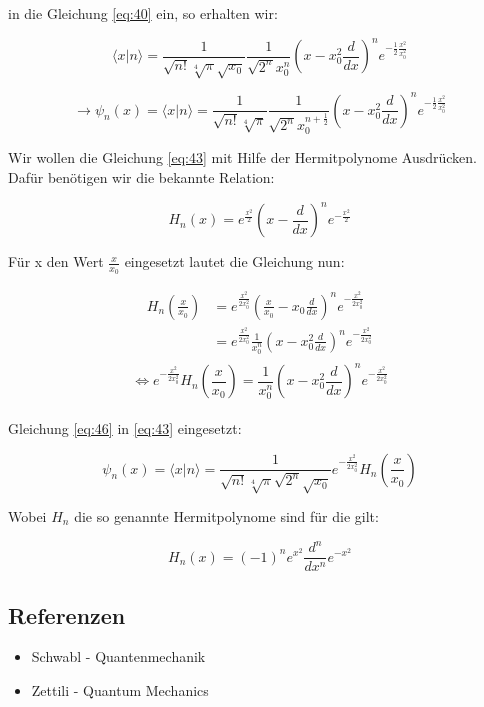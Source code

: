  in die Gleichung \eqref{eq:40} ein, so erhalten wir:

 \begin{equation}
   \label{eq:42}
    \langle x |n\rangle = \frac{1}{\sqrt{n!}\sqrt[4]{\pi}\sqrt{x_0}} \frac{1}{\sqrt{2^n}x_0^n}\left( x - x_0^2 \frac{d}{dx}\right)^n  e^{-\frac{1}{2}\frac{x^2}{x_0^2}}
 \end{equation}

 \begin{equation}
   \label{eq:43}
  \rightarrow  \boxed{\psi_n(x) =  \langle x |n\rangle = \frac{1}{\sqrt{n!}\sqrt[4]{\pi}} \frac{1}{\sqrt{2^n}x_0^{n+\frac{1}{2}}}\left( x - x_0^2 \frac{d}{dx}\right)^n  e^{-\frac{1}{2}\frac{x^2}{x_0^2}}   }
 \end{equation}



Wir wollen die Gleichung \eqref{eq:43} mit Hilfe der Hermitpolynome Ausdrücken. Dafür benötigen wir die bekannte Relation:

\begin{equation}
  \label{eq:44}
  H_n(x) = e^{\frac{x^2}{2}} \left( x-\frac{d}{dx}\right)^n e^{-\frac{x^2}{2}}
\end{equation}

Für x den Wert \(\frac{x}{x_0}\) eingesetzt lautet die Gleichung nun:

\begin{align}
  H_n\left(\frac{x}{x_0} \right) &= e^{\frac{x^2}{2x_0^2}} \left( \frac{x}{x_0}- x_0\frac{d}{dx}\right)^n e^{-\frac{x^2}{2x_0^2}} \\
 &= e^{\frac{x^2}{2x_0^2}} \frac{1}{x_0^n} \left( x - x_0^2\frac{d}{dx}\right)^n e^{-\frac{x^2}{2x_0^2}} \\ \label{eq:45}
\end{align}
\begin{equation}
  \label{eq:46}
  \Leftrightarrow e^{-\frac{x^2}{2x_0^2}}H_n\left(\frac{x}{x_0} \right) = \frac{1}{x_0^n} \left( x - x_0^2\frac{d}{dx}\right)^n e^{-\frac{x^2}{2x_0^2}} 
\end{equation}
\\
Gleichung \eqref{eq:46} in \eqref{eq:43} eingesetzt:

\begin{equation}
  \label{eq:47}
   \boxed{\psi_n(x) =  \langle x |n\rangle = \frac{1}{\sqrt{n!}\sqrt[4]{\pi}\sqrt{2^n}\sqrt{x_0}}  e^{-\frac{x^2}{2x_0^2}}H_n\left(\frac{x}{x_0} \right)   }
\end{equation}

Wobei \(H_n\) die so genannte Hermitpolynome sind für die gilt:

\begin{equation}
  \label{eq:48}
  H_n(x) = (-1)^ne^{x^2}\frac{d^n}{dx^n}e^{-x^2}
\end{equation}



\subsection*{Referenzen}

\begin{itemize}
\item Schwabl - Quantenmechanik
\item Zettili - Quantum Mechanics
\end{itemize}



